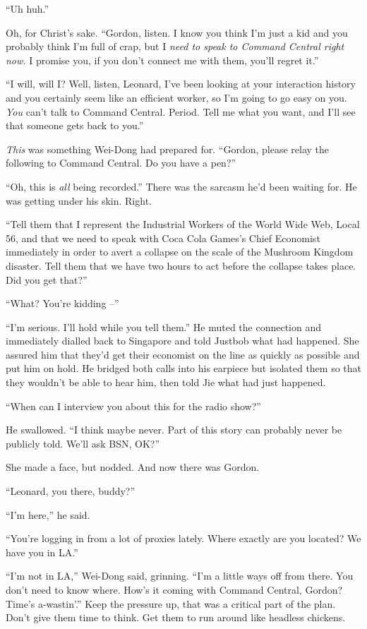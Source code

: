 ``Uh huh.''

Oh, for Christ's sake. ``Gordon, listen. I know you think I'm just a
kid and you probably think I'm full of crap, but I
\emph{need to speak to Command Central right now.} I promise you,
if you don't connect me with them, you'll regret it.''

``I will, will I? Well, listen, Leonard, I've been looking at your
interaction history and you certainly seem like an efficient
worker, so I'm going to go easy on you. \emph{You} can't talk to
Command Central. Period. Tell me what you want, and I'll see that
someone gets back to you.''

\emph{This} was something Wei-Dong had prepared for. ``Gordon,
please relay the following to Command Central. Do you have a pen?''

``Oh, this is \emph{all} being recorded.'' There was the sarcasm he'd
been waiting for. He was getting under his skin. Right.

``Tell them that I represent the Industrial Workers of the World
Wide Web, Local 56, and that we need to speak with Coca Cola
Games's Chief Economist immediately in order to avert a collapse on
the scale of the Mushroom Kingdom disaster. Tell them that we have
two hours to act before the collapse takes place. Did you get
that?''

``What? You're kidding --''

``I'm serious. I'll hold while you tell them.'' He muted the
connection and immediately dialled back to Singapore and told
Justbob what had happened. She assured him that they'd get their
economist on the line as quickly as possible and put him on hold.
He bridged both calls into his earpiece but isolated them so that
they wouldn't be able to hear him, then told Jie what had just
happened.

``When can I interview you about this for the radio show?''

He swallowed. ``I think maybe never. Part of this story can probably
never be publicly told. We'll ask BSN, OK?''

She made a face, but nodded. And now there was Gordon.

``Leonard, you there, buddy?''

``I'm here,'' he said.

``You're logging in from a lot of proxies lately. Where exactly are
you located? We have you in LA.''

``I'm not in LA,'' Wei-Dong said, grinning. ``I'm a little ways off
from there. You don't need to know where. How's it coming with
Command Central, Gordon? Time's a-wastin'.'' Keep the pressure up,
that was a critical part of the plan. Don't give them time to
think. Get them to run around like headless chickens.

